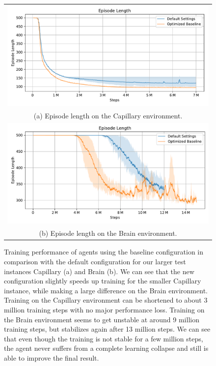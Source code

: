 \begin{figure}[htp]
    \begin{center}
        \begin{tabular}{c}
            \includegraphics[clip, width=0.93\columnwidth]{figures/evaluation/baseline/maze0518_ep_len.pdf} \\
            {\small (a) Episode length on the Capillary environment.} \\
            \addlinespace[0.5cm]
            \includegraphics[clip, width=0.93\columnwidth]{figures/evaluation/baseline/maze0122_ep_len.pdf} \\
            {\small (b) Episode length on the Brain environment.} \\
        \end{tabular}

    \end{center}
    \caption[Training Performance of Baseline Agents on Large Instances]{Training performance of agents using the baseline configuration in comparison with the default configuration for our larger test instances Capillary (a) and Brain (b). We can see that the new configuration slightly speeds up training for the smaller Capillary instance, while making a large difference on the Brain environment. Training on the Capillary environment can be shortened to about 3 million training steps with no major performance loss. Training on the Brain environment seems to get unstable at around 9 million training steps, but stabilizes again after 13 million steps. We can see that even though the training is not stable for a few million steps, the agent never suffers from a complete learning collapse and still is able to improve the final result.} \label{fig:Eval/Baselines/LargeInstances}
\end{figure}

